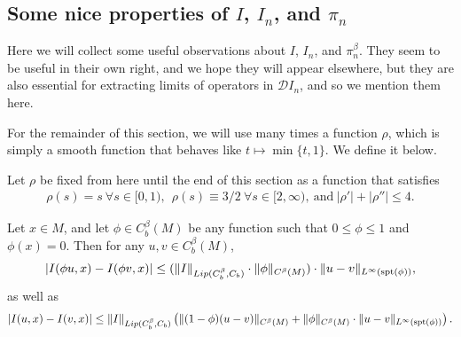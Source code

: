 \documentclass[11pt,reqno]{amsart}
\numberwithin{equation}{section}
\theoremstyle{plain}
\def\D{\mathcal D}
\newcommand{\abs}[1]{\left| #1 \right|}
\newcommand{\norm}[1]{\lVert#1\rVert}
\begin{document}
\subsection{Some nice properties of $I$, $I_n$, and $\pi_n$}\label{sec:NicePropertiesIInPin}

Here we will collect some useful observations about $I$, $I_n$, and $\pi_n^\beta$.  They seem to be useful in their own right, and we hope they will appear elsewhere, but they are also essential for extracting limits of operators in $\D I_n$, and so we mention them here.


For the remainder of this section, we will use many times a function $\rho$, which is simply a smooth function that behaves like $t\mapsto \min\{t,1\}$.  We define it below.

\begin{DEF}\label{def:RhoTheSmoothApproxOfMin(1,t)}
	Let $\rho$ be fixed from here until the end of this section as a function that satisfies 
	\begin{align*}
		\rho(s) = s\ \forall s\in [0,1),\ \ \rho(s)\equiv 3/2\ \forall s\in[2,\infty),\ \text{and}\ \abs{\rho'} + \abs{\rho''}\leq 4.
	\end{align*}
\end{DEF}


\begin{lem}\label{lem:NormEstimateLocalizedToNearAndFarTermsWithTestFunction}
	Let $x\in M$, and let $\phi\in C^\beta_b(M)$ be any function such that $0\leq\phi\leq 1$ and $\phi(x)=0$.  Then for any $u,v\in C^\beta_b(M)$,
	\begin{align}\label{eqMMonM:NormEstimateOnlyLinfty}
		\abs{I(\phi u,x)-I(\phi v,x)}\leq 
		(\norm{I}_{Lip(C^\beta_b,C_b)}\cdot \norm{\phi}_{C^\beta(M)})\cdot \norm{u-v}_{L^\infty(\textnormal{spt}(\phi))},
	\end{align}
	as well as
	\begin{align}\label{eqMMonM:NormEstimateCbetaAndLinfty}
		\abs{I(u,x)-I(v,x)}
		\leq \norm{I}_{Lip(C^\beta_b,C_b)}
		\left(
		\norm{(1-\phi)(u-v)}_{C^\beta(M)}
		+\norm{\phi}_{C^\beta(M)}\cdot\norm{u-v}_{L^\infty(\textnormal{spt}(\phi))}
		\right).
	\end{align}
\end{lem}
\end{document}
